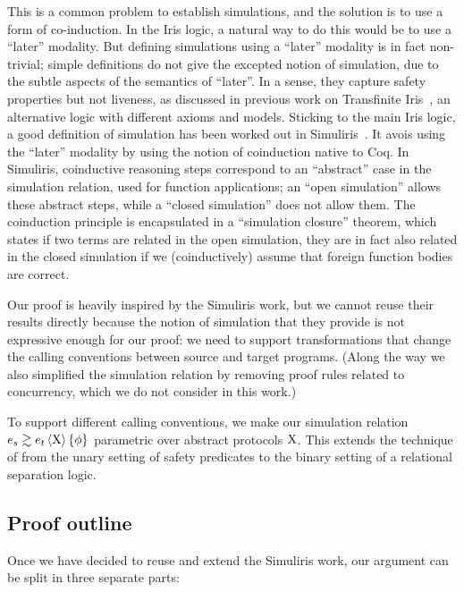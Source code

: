 This is a common problem to establish simulations, and the solution is to use a form of co-induction.
%
In the Iris logic, a natural way to do this would be to use a ``later'' modality.
%
But defining simulations using a ``later'' modality is in fact non-trivial; simple definitions do not give the excepted notion of simulation, due to the subtle aspects of the semantics of ``later''.
%
In a sense, they capture safety properties but not liveness, as discussed in previous
work on Transfinite Iris~\citep*{TODO-transfinite-Iris}, an alternative logic with different axioms and models.
%
Sticking to the main Iris logic, a good definition of simulation has been worked out
in Simuliris~\citep*{TODO-Simuliris}.
%
It avois using the ``later'' modality by using the notion of coinduction native to Coq. In Simuliris, coinductive reasoning steps correspond to an ``abstract'' case in the simulation relation, used for function applications; an ``open simulation'' allows these abstract steps, while a ``closed simulation'' does not allow them.
%
The coinduction principle is encapsulated in a ``simulation closure'' theorem, which states if two terms are related in the open simulation, they are in fact also related in the closed simulation if we (coinductively) assume that foreign function bodies are correct.

Our proof is heavily inspired by the Simuliris work, but we cannot reuse their results directly because the notion of simulation that they provide is not expressive enough for our proof: we need to support transformations that change the calling conventions between source and target programs.
%
(Along the way we also simplified the simulation relation by removing proof rules related to concurrency, which we do not consider in this work.)

To support different calling conventions, we make our simulation relation $\iSim[\Chi]{\phi}{e_s}{e_t}$ parametric over abstract protocols $\mathrm{X}$. This extends the technique of \citet*{TODO-paulo} from the unary setting of safety predicates to the binary setting of a relational separation logic.

\subsection{Proof outline}

Once we have decided to reuse and extend the Simuliris work, our argument can be split in three separate parts:

